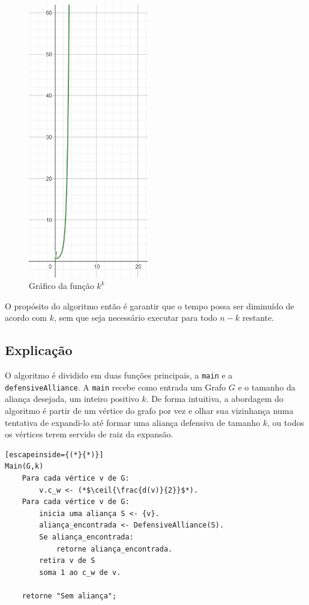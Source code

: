 \begin{figure}[!htb]
\centering
\includegraphics[height=12cm]{GraficoKelevK.png}
\caption{Gráfico da função $k^k$}
\label{fig:kelevk}
\end{figure}

O propósito do algoritmo então é garantir que o tempo possa ser diminuído de acordo com $k$, sem que seja necessário executar para todo $n-k$ restante.

\subsection{Explicação}
O algoritmo é dividido em duas funções principais, a \texttt{main} e a \texttt{defensiveAlliance}. A \texttt{main} recebe como entrada um Grafo $G$ e o tamanho da aliança desejada, um inteiro positivo $k$. De forma intuitiva, a abordagem do algoritmo é partir de um vértice do grafo por vez e olhar sua vizinhança numa tentativa de expandi-lo até formar uma aliança defensiva de tamanho $k$, ou todos os vértices terem servido de raiz da expansão.


\begin{lstlisting}[escapeinside={(*}{*)}]
Main(G,k)
	Para cada vértice v de G:
		v.c_w <- (*$\ceil{\frac{d(v)}{2}}$*).
	Para cada vértice v de G:
		inicia uma aliança S <- {v}.
		aliança_encontrada <- DefensiveAlliance(S).
		Se aliança_encontrada:
			retorne aliança_encontrada.
		retira v de S
		soma 1 ao c_w de v.
			
	retorne "Sem aliança";
\end{lstlisting}

